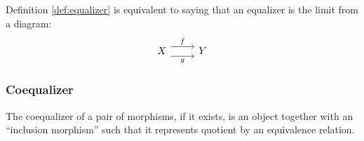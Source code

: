 \begin{definition}
  Definition \ref{def:equalizer} is equivalent to saying that an equalizer is
  the limit from a diagram:
  \[\begin{tikzcd}[ampersand replacement=\&]
    X \& Y
    \arrow["f", shift left=2, from=1-1, to=1-2]
    \arrow["g"', shift right=2, from=1-1, to=1-2]
  \end{tikzcd}\]
\end{definition}

\subsubsection*{Coequalizer}
The coequalizer of a pair of morphisms, if it exists, is an object together with
an ``inclusion morphism'' such that it represents quotient by an equivalence
relation.


